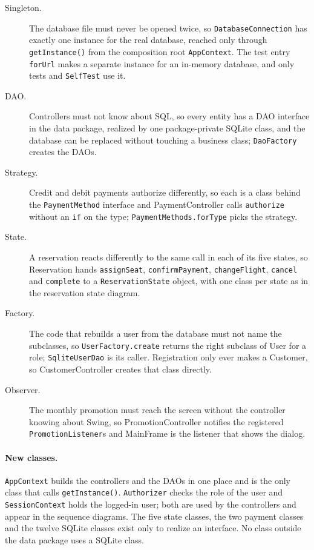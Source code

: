 \begin{description}
\item[Singleton.] The database file must never be opened twice, so
  \texttt{DatabaseConnection} has exactly one instance for the real database, reached only through
  \texttt{getInstance()} from the composition root \texttt{AppContext}. The test entry
  \texttt{forUrl} makes a separate instance for an in-memory database, and only tests and
  \texttt{SelfTest} use it.
\item[DAO.] Controllers must not know about SQL, so every entity has a DAO
  interface in the data package, realized by one package-private SQLite class,
  and the database can be replaced without touching a business class;
  \texttt{DaoFactory} creates the DAOs.
\item[Strategy.] Credit and debit payments authorize differently, so each is a
  class behind the \texttt{PaymentMethod} interface and PaymentController
  calls \texttt{authorize} without an \texttt{if} on the type;
  \texttt{PaymentMethods.\allowbreak forType} picks the strategy.
\item[State.] A reservation reacts differently to the same call in each of its
  five states, so Reservation hands \texttt{assignSeat}, \texttt{confirmPayment},
  \texttt{changeFlight}, \texttt{cancel} and \texttt{complete} to a
  \texttt{ReservationState} object, with one class per state as in the
  reservation state diagram.
\item[Factory.] The code that rebuilds a user from the database must not name the
  subclasses, so \texttt{UserFactory.\allowbreak create} returns the right subclass of User
  for a role; \texttt{SqliteUserDao} is its caller. Registration only ever makes a Customer, so
  CustomerController creates that class directly.
\item[Observer.] The monthly promotion must reach the screen without the
  controller knowing about Swing, so PromotionController notifies the
  registered \texttt{PromotionListener}s and MainFrame is the listener that
  shows the dialog.
\end{description}

\paragraph{New classes.} \texttt{AppContext} builds the controllers and the DAOs
in one place and is the only class that calls \texttt{getInstance()}.
\texttt{Authorizer} checks the role of the user and \texttt{SessionContext} holds
the logged-in user; both are used by the controllers and appear in the sequence
diagrams. The five state classes, the two payment classes and the twelve SQLite
classes exist only to realize an interface. No class outside the data package
uses a SQLite class.

